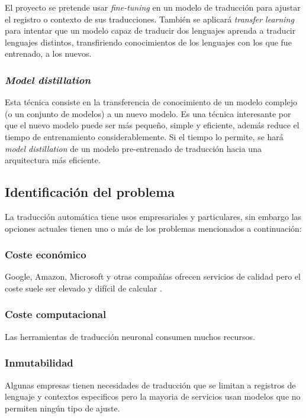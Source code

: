 El proyecto se pretende usar \textit{fine-tuning} en un modelo de traducción para ajustar el registro
o contexto de sus traducciones. También se aplicará \textit{transfer learning} para intentar que un modelo
capaz de traducir dos lenguajes aprenda a traducir lenguajes distintos, transfiriendo conocimientos de los
lenguajes con los que fue entrenado, a los nuevos.

\subsubsection*{\textit{Model distillation}}
Esta técnica consiste en la transferencia de conocimiento de un modelo complejo (o un conjunto de modelos)
a un nuevo modelo.
Es una técnica interesante por que el nuevo modelo puede ser más pequeño, simple y eficiente,
además reduce el tiempo de entrenamiento considerablemente.
Si el tiempo lo permite, se hará \textit{model distillation} de un modelo pre-entrenado de traducción
hacia una arquitectura más eficiente.




\subsection{Identificación del problema}\label{problem}
La traducción automática tiene usos empresariales y particulares, sin embargo las opciones
actuales tienen uno o más de los problemas mencionados a continuación:

\subsubsection*{Coste económico}
Google, Amazon, Microsoft y otras compañías ofrecen servicios de calidad pero el coste
suele ser elevado y difícil de calcular
\cite{GoogleTranslatePricing,AWSTranslatePricing,MicrosoftTranslatePricing}.

\subsubsection*{Coste computacional}
Las herramientas de traducción neuronal consumen muchos recursos.

\subsubsection*{Inmutabilidad}
Algunas empresas tienen necesidades de traducción que se limitan a registros de
lenguaje y contextos especificos pero la mayoria de servicios usan modelos que no
permiten ningún tipo de ajuste.  

